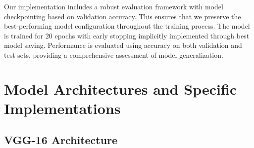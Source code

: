 \documentclass[a4paper,12pt]{report}
\begin{document}
Our implementation includes a robust evaluation framework with model checkpointing based on validation accuracy. This ensures that we preserve the best-performing model configuration throughout the training process. The model is trained for 20 epochs with early stopping implicitly implemented through best model saving. Performance is evaluated using accuracy on both validation and test sets, providing a comprehensive assessment of model generalization.

\section{Model Architectures and Specific Implementations}

\subsection{VGG-16 Architecture}
\end{document}
